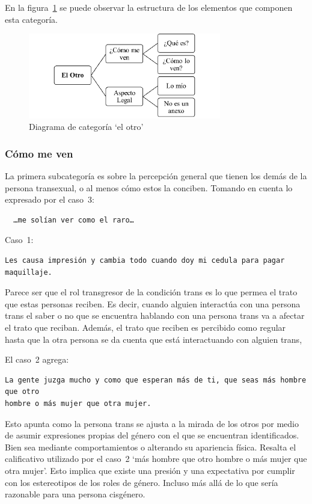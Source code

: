 En la figura~\ref{fig:otro} se puede observar la estructura de los elementos que
componen esta categoría.

\begin{figure}
    \centering
    \includegraphics[width=0.75\textwidth]{otro}
    \caption{Diagrama de categoría ‘el otro’}\label{fig:otro}
\end{figure}

\subsubsection{Cómo me ven}

La primera subcategoría es sobre la percepción general que tienen los demás de
la persona transexual, o al menos cómo estos la conciben. Tomando en cuenta lo
expresado por el caso~3:

\begin{verbatim}
  …me solían ver como el raro…
\end{verbatim}

Caso~1:

\begin{verbatim}
Les causa impresión y cambia todo cuando doy mi cedula para pagar maquillaje.
\end{verbatim}

Parece ser que el rol transgresor de la condición trans es lo que permea el
trato que estas personas reciben. Es decir, cuando alguien interactúa con una
persona trans el saber o no que se encuentra hablando con una persona trans va a
afectar el trato que reciban. Además, el trato que reciben es percibido como
regular hasta que la otra persona se da cuenta que está interactuando con
alguien trans,

El caso~2 agrega:

\begin{verbatim}
La gente juzga mucho y como que esperan más de ti, que seas más hombre que otro
hombre o más mujer que otra mujer.
\end{verbatim}

Esto apunta como la persona trans se ajusta a la mirada de los otros por medio
de asumir expresiones propias del género con el que se encuentran identificados.
Bien sea mediante comportamientos o alterando su apariencia física. Resalta el
calificativo utilizado por el caso~2 ‘más hombre que otro hombre o más mujer
que otra mujer’. Esto implica que existe una presión y una expectativa por
cumplir con los estereotipos de los roles de género. Incluso más allá de lo que
sería razonable para una persona cisgénero.

